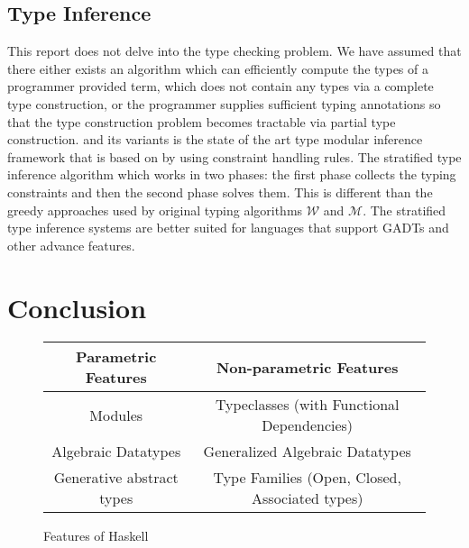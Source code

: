 \documentclass[manuscript,screen,nonacm]{acmart}
\begin{document}
\subsection{Type Inference}
This report does not delve into the type checking problem. We have assumed that there either exists an algorithm which can efficiently compute the types of a programmer provided term, which does not contain any types via a complete type construction\cite{milner_theory_1978}, or the programmer supplies sufficient typing annotations so that the type construction problem becomes tractable via partial type construction\cite{pierce_local_2000, dunfield_bidirectional_2021}. \HMX and its variants is the state of the art type modular inference framework that is based on by using constraint handling rules. The stratified type inference algorithm\cite{pottier_stratified_2006} which works in two phases: the first phase collects the typing constraints and then the second phase solves them. This is different than the greedy approaches used by original typing algorithms\cite{lee_proofs_1998} $\mathcal{W}$ and $\mathcal{M}$. The stratified type inference systems are better suited for languages that support GADTs and other advance features\cite{vytiniotis_outsideinx_2011}.

\section{Conclusion}\label{sec:conclusion}

\begin{figure}[ht]
 \centering
 \begin{tabular}[ht]{c | c}
 Parametric Features         & Non-parametric Features \\
 \hline
 Modules                     & Typeclasses (with Functional Dependencies)\\
 Algebraic Datatypes         & Generalized Algebraic Datatypes\\
 Generative abstract types   & Type Families (Open, Closed, Associated types)\\

 \end{tabular}
 \caption{Features of Haskell}
 \label{fig:haskell-lang-features}
\end{figure}
\end{document}

